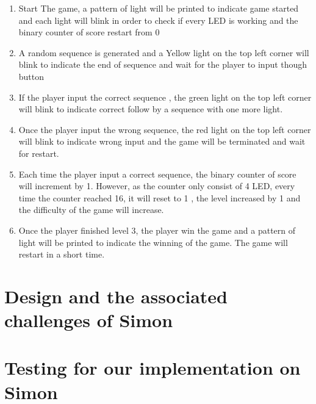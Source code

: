 \documentclass[11pt]{article}
\begin{document}
\begin{enumerate}
\item Start The game, a pattern of light will be printed to indicate game started and each light will blink in order to check if every LED is working and the binary counter of score restart from 0

\item A random sequence is generated and a Yellow light on the top left corner will blink to indicate the end of sequence and wait for the player to input though button

\item If the player input the correct sequence , the green light on the top left corner will blink to indicate correct follow by a sequence with one more light.

\item Once the player input the wrong sequence, the red light on the top left corner will blink to indicate wrong input and the game will be terminated and wait for restart.

\item Each time the player input a correct sequence, the binary counter of score will increment by 1. However, as the counter only consist of 4 LED, every time the counter reached 16, it will reset to 1 , the level increased by 1 and the difficulty of the game will increase.

\item Once the player finished level 3, the player win the game and a pattern of light will be printed to indicate the winning of the game. The game will restart in a short time.

\end{enumerate}  





\section{Design and the associated challenges of Simon}

\section{Testing for our implementation on Simon}
\end{document}
